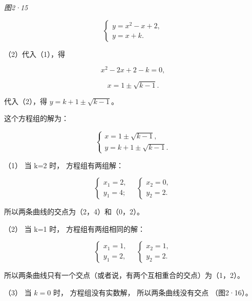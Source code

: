 \emph{图2·15}

\[
\left\{ \begin{array}{l} y = x^{2} - x + 2, \\ y = x + k. \end{array} \right. \tag {1}
\]

（2）代入（1），得

\[
x^{2} - 2 x + 2 - k = 0,
\]

\[
x = 1 \pm \sqrt {k - 1}.
\]

代入（2），得 \(y = k + 1 \pm \sqrt{k - 1}\)。

这个方程组的解为：

\[
\left\{ \begin{array}{l} x = 1 \pm \sqrt {k - 1}, \\ y = k + 1 \pm \sqrt {k - 1}. \end{array} \right.
\]

（1） 当 k=2 时， 方程组有两组解：

\[
\left\{ \begin{array}{l} x_{1} = 2, \\ y_{1} = 4; \end{array} \right. \quad \left\{ \begin{array}{l} x_{2} = 0, \\ y_{2} = 2. \end{array} \right.
\]

所以两条曲线的交点为（2，4）和（0，2）。

（2） 当 k=1 时， 方程组有两组相同的解：

\[
\left\{ \begin{array}{l} x_{1} = 1, \\ y_{1} = 2, \end{array} \right. \quad \left\{ \begin{array}{l} x_{2} = 1, \\ y_{2} = 2. \end{array} \right.
\]

所以两条曲线只有一个交点（或者说，有两个互相重合的交点）为（1，2）。

（3） 当 \(k = 0\) 时， 方程组没有实数解， 所以两条曲线没有交点
（图2·16）。

